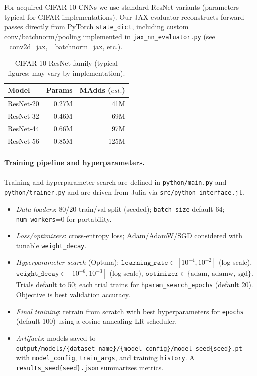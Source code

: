 \documentclass[11pt]{article}
\begin{document}
For acquired CIFAR-10 CNNs we use standard ResNet variants (parameters typical for CIFAR implementations). Our JAX evaluator reconstructs forward passes directly from PyTorch \texttt{state\_dict}, including custom conv/batchnorm/pooling implemented in \texttt{jax\_nn\_evaluator.py} (see \_conv2d\_jax, \_batchnorm\_jax, etc.).
\begin{table}[h!]
\centering
\caption{CIFAR-10 ResNet family (typical figures; may vary by implementation).}
\begin{tabular}{@{}lrr@{}}
\toprule
Model & Params & MAdds ($est.$) \\
\midrule
ResNet-20 & 0.27M & 41M \\
ResNet-32 & 0.46M & 69M \\
ResNet-44 & 0.66M & 97M \\
ResNet-56 & 0.85M & 125M \\
\bottomrule
\end{tabular}
\end{table}

\paragraph{Training pipeline and hyperparameters.} Training and hyperparameter search are defined in \texttt{python/main.py} and \texttt{python/trainer.py} and are driven from Julia via \texttt{src/python\_interface.jl}.
\begin{itemize}[leftmargin=1.5em]
  \item \emph{Data loaders}: 80/20 train/val split (seeded); \texttt{batch\_size} default 64; \texttt{num\_workers}=0 for portability.
  \item \emph{Loss/optimizers}: cross-entropy loss; Adam/AdamW/SGD considered with tunable \texttt{weight\_decay}.
  \item \emph{Hyperparameter search} (Optuna): $\texttt{learning\_rate} \in [10^{-4},10^{-2}]$ (log-scale), $\texttt{weight\_decay} \in [10^{-6},10^{-3}]$ (log-scale), $\texttt{optimizer} \in \{\text{adam, adamw, sgd}\}$. Trials default to 50; each trial trains for \texttt{hparam\_search\_epochs} (default 20). Objective is best validation accuracy.
  \item \emph{Final training}: retrain from scratch with best hyperparameters for \texttt{epochs} (default 100) using a cosine annealing LR scheduler.
  \item \emph{Artifacts}: models saved to \texttt{output/models/\{dataset\_name\}/\{model\_config\}/model\_seed\{seed\}.pt} with \texttt{model\_config}, \texttt{train\_args}, and training \texttt{history}. A \texttt{results\_seed\{seed\}.json} summarizes metrics.
\end{itemize}
\end{document}
